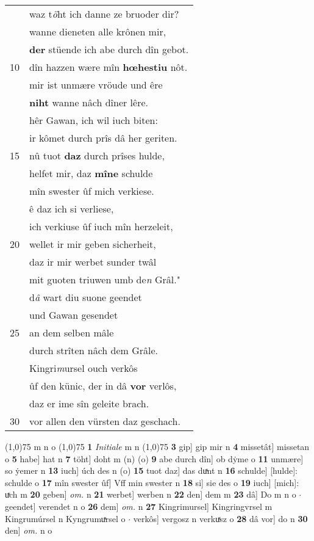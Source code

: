 \documentclass[8pt,a4paper,notitlepage]{article}
\begin{document}
\begin{table}[ht]
\begin{minipage}[t]{0.5\linewidth}
\begin{tabular}{rl}
 & waz t\textit{ö}ht ich danne ze bruoder dir?\\ 
 & wanne dieneten alle krônen mir,\\ 
 & \textbf{der} stüende ich abe durch dîn gebot.\\ 
10 & dîn hazzen wære mîn \textbf{hœhestiu} nôt.\\ 
 & mir ist unmære vröude und êre\\ 
 & \textbf{niht} wanne nâch dîner lêre.\\ 
 & hêr Gawan, ich wil iuch biten:\\ 
 & ir kômet durch prîs dâ her geriten.\\ 
15 & nû tuot \textbf{daz} durch prîses hulde,\\ 
 & helfet mir, daz \textbf{mîne} schulde\\ 
 & mîn swester ûf mich verkiese.\\ 
 & ê daz ich si verliese,\\ 
 & ich verkiuse ûf iuch mîn herzeleit,\\ 
20 & wellet ir mir geben sicherheit,\\ 
 & daz ir mir werbet sunder twâl\\ 
 & mit guoten triuwen umb de\textit{n} Grâl."\\ 
 & d\textit{â} wart diu suone geendet\\ 
 & und Gawan gesendet\\ 
25 & an dem selben mâle\\ 
 & durch strîten nâch dem Grâle.\\ 
 & Kingri\textit{m}ursel ouch verkôs\\ 
 & ûf den künic, der in dâ \textbf{vor} verlôs,\\ 
 & daz er ime sîn geleite brach.\\ 
30 & vor allen den vürsten daz geschach.\\ 
\end{tabular}
\scriptsize
\line(1,0){75} \newline
m n o \newline
\line(1,0){75} \newline
\textbf{1} \textit{Initiale} m n  \newline
\line(1,0){75} \newline
\textbf{3} gip] gip mir n \textbf{4} missetât] missetan o \textbf{5} habe] hat n \textbf{7} töht] doht m (n) (o) \textbf{9} abe durch dîn] ob dẏme o \textbf{11} unmære] so ẏemer n \textbf{13} iuch] úch des n (o) \textbf{15} tuot daz] das duͯnt n \textbf{16} schulde] [hulde]: schulde o \textbf{17} mîn swester ûf] Vff min swester n \textbf{18} si] sie des o \textbf{19} iuch] [mich]: uͯch m \textbf{20} geben] \textit{om.} n \textbf{21} werbet] werben n \textbf{22} den] dem m \textbf{23} dâ] Do m n o  $\cdot$ geendet] verendet n o \textbf{26} dem] \textit{om.} n \textbf{27} Kingrimursel] Kingringvrsel m Kingrumúrsel n Kyngrumuͯrsel o  $\cdot$ verkôs] vergosz n verkuͯsz o \textbf{28} dâ vor] do n \textbf{30} den] \textit{om.} n o \newline
\end{minipage}
\end{table}
\end{document}
